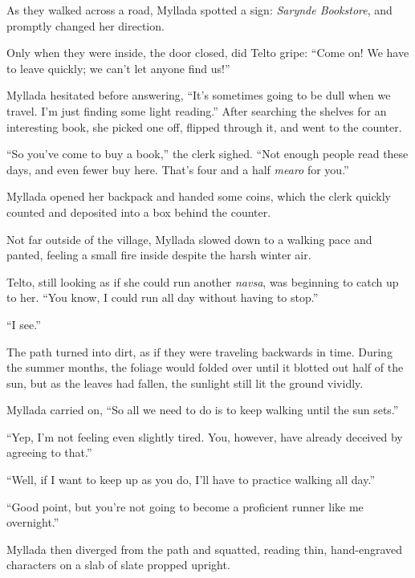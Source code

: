 As they walked across a road, Myllada spotted a sign: \emph{Sarynde Bookstore}, and promptly changed her direction.

Only when they were inside, the door closed, did Telto gripe: ``Come on! We have to leave quickly; we can't let anyone find us!''

Myllada hesitated before answering, ``It's sometimes going to be dull when we travel. I'm just finding some light reading.'' After searching the shelves for an interesting book, she picked one off, flipped through it, and went to the counter.

``So you've come to buy a book,'' the clerk sighed. ``Not enough people read these days, and even fewer buy here. That's four and a half \emph{mearo} for you.''

Myllada opened her backpack and handed some coins, which the clerk quickly counted and deposited into a box behind the counter.

\centeredstars

Not far outside of the village, Myllada slowed down to a walking pace and panted, feeling a small fire inside despite the harsh winter air.

Telto, still looking as if she could run another \emph{navsa}, was beginning to catch up to her. ``You know, I could run all day without having to stop.''

``I see.''

The path turned into dirt, as if they were traveling backwards in time. During the summer months, the foliage would folded over until it blotted out half of the sun, but as the leaves had fallen, the sunlight still lit the ground vividly.

Myllada carried on, ``So all we need to do is to keep walking until the sun sets.''

``Yep, I'm not feeling even slightly tired. You, however, have already deceived by agreeing to that.''

``Well, if I want to keep up as you do, I'll have to practice walking all day.''

``Good point, but you're not going to become a proficient runner like me overnight.''

Myllada then diverged from the path and squatted, reading thin, hand-engraved characters on a slab of slate propped upright.


